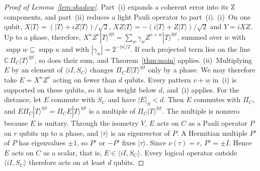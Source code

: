 \documentclass[aps,prl,reprint,twocolumn,amsmath,amssymb,floatfix,nofootinbib,superscriptaddress]{revtex4-2}
\theoremstyle{definition}
\theoremstyle{remark}
\begin{document}
\begin{proof}[Proof of Lemma~\ref{lem:shadow}]
Part~(i) expands a coherent error into its Z components, and part~(ii) reduces a light Pauli operator to part~(i).
(i)~On one qubit, $X|T\rangle=(|T\rangle+iZ|T\rangle)/\sqrt2$, $XZ|T\rangle=-(i|T\rangle+Z|T\rangle)/\sqrt2$ and $Y=iXZ$. Up to a phase, therefore, $X^uZ^v|T\rangle^{\otimes t}=\sum_w\gamma_wZ^{v+w}|T\rangle^{\otimes t}$, summed over $w$ with $\operatorname{supp}w\subseteq\operatorname{supp}u$ and with $|\gamma_w|=2^{-|u|/2}$. If each projected term lies on the line $\mathbb C\,\Pi_C|T\rangle^{\otimes t}$, so does their sum, and Theorem~\ref{thm:main} applies. (ii)~Multiplying $E$ by an element of $\langle iI,S_C\rangle$ changes $\Pi_CE|T\rangle^{\otimes t}$ only by a phase. We may therefore take $E=X^uZ^v$ acting on fewer than $d$ qubits. Every pattern $v+w$ in~(i) is supported on these qubits, so it has weight below $d$, and~(i) applies. For the distance, let $E$ commute with $S_C$ and have $|E|_S<d$. Then $E$ commutes with $\Pi_C$, and $E\Pi_C|T\rangle^{\otimes t}=\Pi_CE|T\rangle^{\otimes t}$ is a multiple of $\Pi_C|T\rangle^{\otimes t}$. The multiple is nonzero because $E$ is unitary. Through the isometry $V$, $E$ acts on $C$ as a Pauli operator $P$ on $r$ qubits up to a phase, and $|\tau\rangle$ is an eigenvector of $P$. A Hermitian multiple $P'$ of $P$ has eigenvalues $\pm1$, so $P'$ or $-P'$ fixes $|\tau\rangle$. Since $\nu(\tau)=r$, $P'=\pm I$. Hence $E$ acts on $C$ as a scalar, that is, $E\in\langle iI,S_C\rangle$. Every logical operator outside $\langle iI,S_C\rangle$ therefore acts on at least $d$ qubits.
\end{proof}
\end{document}
